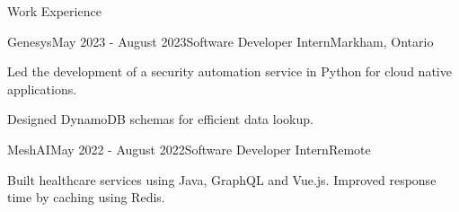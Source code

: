 \documentclass[
	12pt, %
]{resume} %
\begin{document}

\begin{rSection}{Work Experience}

	\begin{rSubsection}{Genesys}{May 2023 - August 2023}{Software Developer Intern}{Markham, Ontario}
		\item Led the development of a security automation service in Python for cloud native applications.
		\item Designed DynamoDB schemas for efficient data lookup.
	\end{rSubsection}


	\begin{rSubsection}{MeshAI}{May 2022 - August 2022}{Software Developer Intern}{Remote}
		\item Built healthcare services using Java, GraphQL and Vue.js. Improved response time by caching using Redis.
	\end{rSubsection}



\end{rSection}
\end{document}
